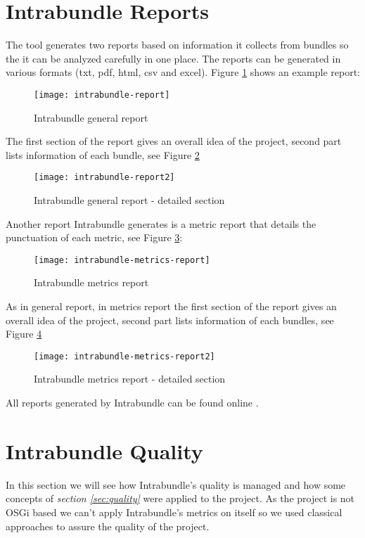 \section{Intrabundle Reports}
\label{sec:intrabundle-reports}
The tool generates two reports based on information it collects from bundles so the it can be analyzed carefully in one place. The reports can be generated in various formats (txt, pdf, html, csv and excel). Figure \ref{intrabundle-report1} shows an example report:  

\begin{figure}[h]
\caption{Intrabundle general report}
\label{intrabundle-report1}
\centering
\texttt{[image: intrabundle-report]}
\end{figure}  
\FloatBarrier

The first section of the report gives an overall idea of the project, second part lists information of each bundle, see Figure \ref{intrabundle-report2} 

\begin{figure}[h]
\caption{Intrabundle general report - detailed section }
\label{intrabundle-report2}
\centering
\texttt{[image: intrabundle-report2]}
\end{figure}  
\FloatBarrier

Another report Intrabundle generates is a metric report that details the punctuation of each metric, see Figure \ref{intrabundle-metrics-report}:  

\begin{figure}[h]
\caption{Intrabundle metrics report}
\label{intrabundle-metrics-report}
\centering
\texttt{[image: intrabundle-metrics-report]}
\end{figure}  
\FloatBarrier

As in general report, in metrics report the first section of the report gives an overall idea of the project, second part lists information of each bundles, see Figure \ref{intrabundle-metrics-report2} 

\begin{figure}[h]
\caption{Intrabundle metrics report - detailed section}
\label{intrabundle-metrics-report2}
\centering
\texttt{[image: intrabundle-metrics-report2]}
\end{figure}  
\FloatBarrier

All reports generated by Intrabundle can be found online \citep{intrabundle reports 2014}.

\section{Intrabundle Quality}
In this section we will see how Intrabundle's quality is managed and how some concepts of \textit{section \ref{sec:quality}} were applied to the project. As the project is not OSGi based we can't apply Intrabundle's metrics on itself so we used classical approaches to assure the quality of the project.

